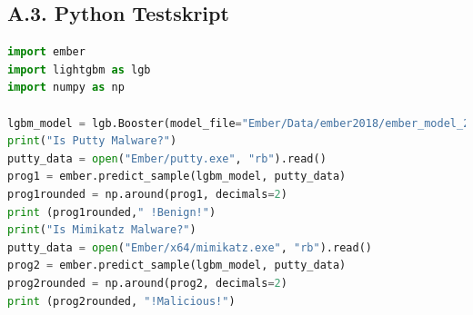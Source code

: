 \documentclass[
    12pt, %
    DIV10,
    ngerman, %
    a4paper, %
    oneside, %
    titlepage, %
    parskip=half, %
    headings=normal, %
    listof=totoc, %
    bibliography=totoc, %
    index=totoc, %
    captions=tableheading, %
    final %
]{scrreprt}
\begin{document}
\subsection*{A.3. Python Testskript}\label{testskript}
\begin{lstlisting}[language=Python]
import ember
import lightgbm as lgb
import numpy as np

lgbm_model = lgb.Booster(model_file="Ember/Data/ember2018/ember_model_2018.txt")
print("Is Putty Malware?")
putty_data = open("Ember/putty.exe", "rb").read()
prog1 = ember.predict_sample(lgbm_model, putty_data)
prog1rounded = np.around(prog1, decimals=2)
print (prog1rounded," !Benign!")
print("Is Mimikatz Malware?")
putty_data = open("Ember/x64/mimikatz.exe", "rb").read()
prog2 = ember.predict_sample(lgbm_model, putty_data)
prog2rounded = np.around(prog2, decimals=2)
print (prog2rounded, "!Malicious!")
\end{lstlisting}

\end{document}
